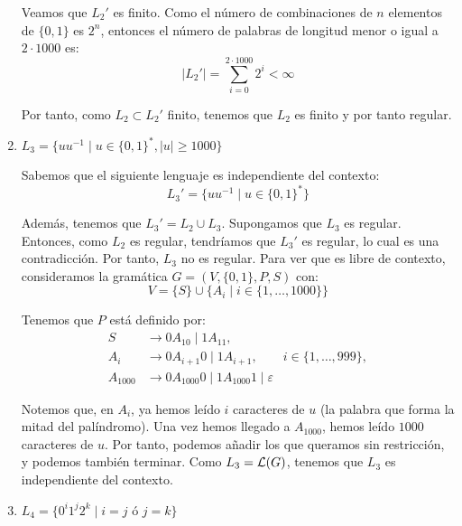 \begin{ejercicio}
\begin{enumerate}
        Veamos que $L_2'$ es finito. Como el número de combinaciones de $n$ elementos de $\{0,1\}$ es $2^n$, entonces el número de palabras de longitud menor o igual a $2\cdot 1000$ es:
        \begin{equation*}
            |L_2'| = \sum_{i=0}^{2\cdot 1000} 2^i <\infty
        \end{equation*}

        Por tanto, como $L_2\subset L_2'$ finito, tenemos que $L_2$ es finito y por tanto regular.

        \item $L_3=\{uu^{-1} \mid u \in {\{0,1\}}^\ast, |u|\geq 1000\}$
        
        Sabemos que el siguiente lenguaje es independiente del contexto:
        \begin{equation*}
            L_3' = \{uu^{-1} \mid u \in {\{0,1\}}^\ast\}
        \end{equation*}

        Además, tenemos que $L_3'=L_2\cup L_3$. Supongamos que $L_3$ es regular. Entonces, como $L_2$ es regular, tendríamos que $L_3'$ es regular, lo cual es una contradicción. Por tanto, $L_3$ no es regular.
        Para ver que es libre de contexto, consideramos la gramática $G=(V,\{0,1\},P,S)$ con:
        \begin{equation*}
            V=\{S\}\cup \{A_i\mid i\in \{1,\dots,1000\}\}
        \end{equation*}

        Tenemos que $P$ está definido por:
        \begin{align*}
            S &\rightarrow 0A_10 \mid 1A_11, \\
            A_i &\rightarrow 0A_{i+1}0 \mid 1A_{i+1},\qquad i\in \{1,\dots,999\},\\
            A_{1000} &\rightarrow 0A_{1000}0 \mid 1A_{1000}1 \mid \varepsilon
        \end{align*}

        Notemos que, en $A_i$, ya hemos leído $i$ caracteres de $u$ (la palabra que forma la mitad del palíndromo).
        Una vez hemos llegado a $A_{1000}$, hemos leído $1000$ caracteres de $u$. Por tanto, podemos añadir los que queramos sin restricción, y podemos también terminar.
        Como $L_3=\mathcal{L}(G)$, tenemos que $L_3$ es independiente del contexto.
        
        \item $L_4=\{0^i 1^j 2^k \mid i = j \text{\ ó\ } j=k\}$
        

\end{enumerate}
\end{ejercicio}
